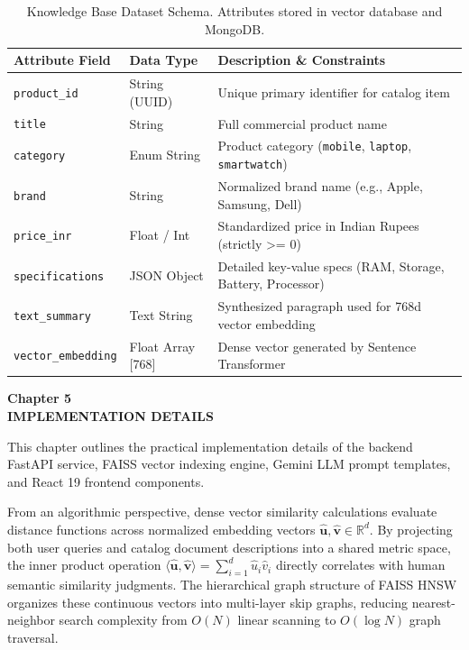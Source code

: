 \documentclass[12pt,a4paper]{article}
\begin{document}
\begin{table}[h]
\centering
\caption{Knowledge Base Dataset Schema. Attributes stored in vector database and MongoDB.}
\label{tab:4_1}
\begin{tabularx}{\textwidth}{@{} l l X @{}}
\toprule
\textbf{Attribute Field} & \textbf{Data Type} & \textbf{Description \& Constraints} \\
\midrule
\texttt{product\_id} & String (UUID) & Unique primary identifier for catalog item \\
\texttt{title} & String & Full commercial product name \\
\texttt{category} & Enum String & Product category (\texttt{mobile}, \texttt{laptop}, \texttt{smartwatch}) \\
\texttt{brand} & String & Normalized brand name (e.g., Apple, Samsung, Dell) \\
\texttt{price\_inr} & Float / Int & Standardized price in Indian Rupees (strictly >= 0) \\
\texttt{specifications} & JSON Object & Detailed key-value specs (RAM, Storage, Battery, Processor) \\
\texttt{text\_summary} & Text String & Synthesized paragraph used for 768d vector embedding \\
\texttt{vector\_embedding} & Float Array [768] & Dense vector generated by Sentence Transformer \\
\bottomrule
\end{tabularx}
\end{table}

\newpage

\label{chap:5}
\begin{center}
{\fontsize{14}{17}\bfseries Chapter 5\\[6pt]}
{\fontsize{16}{20}\bfseries IMPLEMENTATION DETAILS\\[10pt]}
\end{center}

This chapter outlines the practical implementation details of the backend FastAPI service, FAISS vector indexing engine, Gemini LLM prompt templates, and React 19 frontend components.



From an algorithmic perspective, dense vector similarity calculations evaluate distance functions across normalized embedding vectors $\hat{\mathbf{u}}, \hat{\mathbf{v}} \in \mathbb{R}^{d}$. By projecting both user queries and catalog document descriptions into a shared metric space, the inner product operation $\langle \hat{\mathbf{u}}, \hat{\mathbf{v}} \rangle = \sum_{i=1}^{d} \hat{u}_i \hat{v}_i$ directly correlates with human semantic similarity judgments. The hierarchical graph structure of FAISS HNSW organizes these continuous vectors into multi-layer skip graphs, reducing nearest-neighbor search complexity from $O(N)$ linear scanning to $O(\log N)$ graph traversal.
\end{document}
